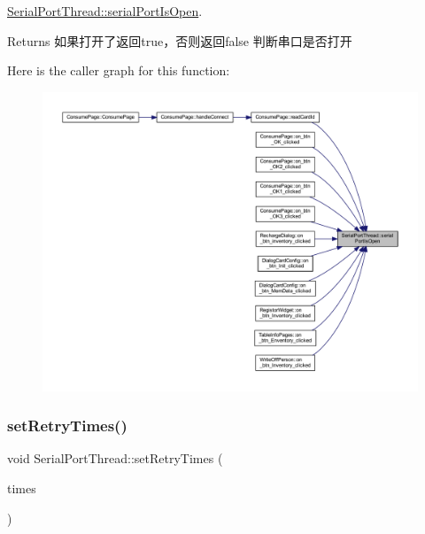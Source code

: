 \mbox{\hyperlink{class_serial_port_thread_abbdd068503223fcd5f3d2376eb78c50e}{Serial\+Port\+Thread\+::serial\+Port\+Is\+Open}}. 

\begin{DoxyReturn}{Returns}
如果打开了返回true，否则返回false 判断串口是否打开 
\end{DoxyReturn}
Here is the caller graph for this function\+:
\nopagebreak
\begin{figure}[H]
\begin{center}
\leavevmode
\includegraphics[width=350pt]{class_serial_port_thread_abbdd068503223fcd5f3d2376eb78c50e_icgraph}
\end{center}
\end{figure}
\mbox{\label{class_serial_port_thread_a0508026c05c1c2b2c1d2912be2162a9f}} 
\subsubsection{\texorpdfstring{setRetryTimes()}{setRetryTimes()}}
{\footnotesize\ttfamily void Serial\+Port\+Thread\+::set\+Retry\+Times (\begin{DoxyParamCaption}\item[{\mbox{\hyperlink{serialportthread_8h_a58c73f770d96826095f8f3824737f67b}{Read\+Retry\+Times}}}]{times }\end{DoxyParamCaption})}



